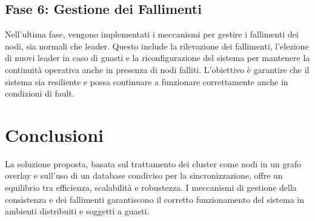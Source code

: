 \documentclass[12pt, a4paper]{report}
\begin{document}
\subsection*{Fase 6: Gestione dei Fallimenti}

Nell'ultima fase, vengono implementati i meccanismi per gestire i fallimenti dei nodi, sia normali che leader. Questo include la rilevazione dei fallimenti, l'elezione di nuovi leader in caso di guasti e la riconfigurazione del sistema per mantenere la continuit\`a operativa anche in presenza di nodi falliti. L'obiettivo \`e garantire che il sistema sia resiliente e possa continuare a funzionare correttamente anche in condizioni di fault.

\section{Conclusioni}

La soluzione proposta, basata sul trattamento dei cluster come nodi in un grafo overlay e sull'uso di un database condiviso per la sincronizzazione, offre un equilibrio tra efficienza, scalabilit\`a e robustezza. I meccanismi di gestione della consistenza e dei fallimenti garantiscono il corretto funzionamento del sistema in ambienti distribuiti e soggetti a guasti.
\end{document}
